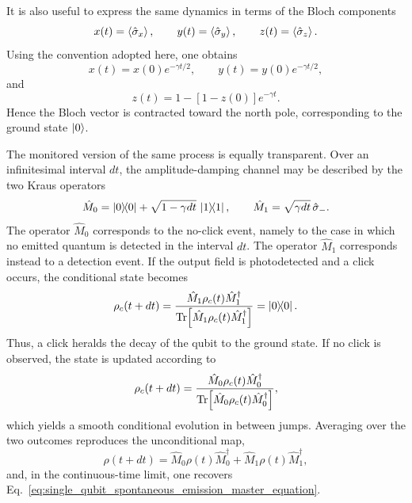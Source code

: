 It is also useful to express the same dynamics in terms of the Bloch components
\begin{equation}
	x(t)=\expval{\hat \sigma_x},
	\qquad
	y(t)=\expval{\hat \sigma_y},
	\qquad
	z(t)=\expval{\hat \sigma_z}.
	\label{eq:single_qubit_spontaneous_emission_bloch_components}
\end{equation}
Using the convention adopted here, one obtains
\begin{equation}
	x(t)=x(0)e^{-\gamma t/2},
	\qquad
	y(t)=y(0)e^{-\gamma t/2},
	\label{eq:single_qubit_spontaneous_emission_bloch_xy}
\end{equation}
and
\begin{equation}
	z(t)=1-\left[1-z(0)\right]e^{-\gamma t}.
	\label{eq:single_qubit_spontaneous_emission_bloch_z}
\end{equation}
Hence the Bloch vector is contracted toward the north pole, corresponding to the ground state \(\ket{0}\).

The monitored version of the same process is equally transparent. Over an infinitesimal interval \(dt\), the amplitude-damping channel may be described by the two Kraus operators
\begin{equation}
	\hat M_0
	=
	\dyad{0}{0}
	+
	\sqrt{1-\gamma dt}\,\dyad{1}{1},
	\qquad
	\hat M_1
	=
	\sqrt{\gamma dt}\,\hat \sigma_-.
	\label{eq:single_qubit_spontaneous_emission_kraus}
\end{equation}
The operator \(\hat M_0\) corresponds to the no-click event, namely to the case in which no emitted quantum is detected in the interval \(dt\). The operator \(\hat M_1\) corresponds instead to a detection event. If the output field is photodetected and a click occurs, the conditional state becomes
\begin{equation}
	\rho_c(t+dt)
	=
	\frac{\hat M_1 \rho_c(t)\hat M_1^\dagger}
	{\Tr\!\left[\hat M_1 \rho_c(t)\hat M_1^\dagger\right]}
	=
	\dyad{0}{0}.
	\label{eq:single_qubit_spontaneous_emission_click_state}
\end{equation}
Thus, a click heralds the decay of the qubit to the ground state. If no click is observed, the state is updated according to
\begin{equation}
	\rho_c(t+dt)
	=
	\frac{\hat M_0 \rho_c(t)\hat M_0^\dagger}
	{\Tr\!\left[\hat M_0 \rho_c(t)\hat M_0^\dagger\right]},
	\label{eq:single_qubit_spontaneous_emission_no_click_state}
\end{equation}
which yields a smooth conditional evolution in between jumps. Averaging over the two outcomes reproduces the unconditional map,
\begin{equation}
	\rho(t+dt)
	=
	\hat M_0 \rho(t)\hat M_0^\dagger
	+
	\hat M_1 \rho(t)\hat M_1^\dagger,
	\label{eq:single_qubit_spontaneous_emission_unconditional_map}
\end{equation}
and, in the continuous-time limit, one recovers Eq.~\eqref{eq:single_qubit_spontaneous_emission_master_equation}.

